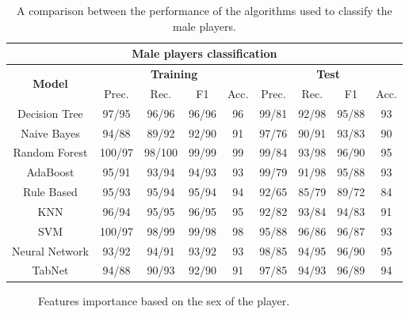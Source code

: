 \begin{table}[H]\footnotesize
\centering
\begin{tabular}{c|c|c|c|c|c|c|c|c}\hline \hline
\multicolumn{9}{c}{\textbf{Male players classification}}\\ \hline \hline
\multirow{2}{*}{\textbf{Model}} & \multicolumn{4}{c|}{\textbf{Training}} & \multicolumn{4}{c}{\textbf{Test}} \\\cline{2-9}
& Prec. & Rec. & F1 & Acc. & Prec. & Rec. & F1 & Acc. \\\hline
Decision Tree & 97/95 & 96/96 & 96/96 & 96 & 99/81 & 92/98 & 95/88 & 93 \\
Naive Bayes & 94/88 & 89/92 & 92/90 & 91 & 97/76 & 90/91 & 93/83 & 90\\
\rowcolor{yellow!70} Random Forest & 100/97 & 98/100 & 99/99 & 99 & 99/84 & 93/98 & 96/90 & 95\\
AdaBoost & 95/91 & 93/94 & 94/93 & 93& 99/79 & 91/98& 95/88 & 93\\
Rule Based & 95/93 & 95/94 & 95/94 & 94 & 92/65 & 85/79 & 89/72 & 84\\
KNN & 96/94 & 95/95 & 96/95 & 95 & 92/82 & 93/84 & 94/83 & 91\\
SVM & 100/97 & 98/99 & 99/98 & 98 & 95/88 & 96/86 & 96/87 & 93\\
\rowcolor{gray!40} Neural Network & 93/92 & 94/91 & 93/92 & 93 & 98/85 & 94/95 & 96/90 & 95\\
\rowcolor{brown!50}TabNet & 94/88 & 90/93 & 92/90 & 91 & 97/85 & 94/93 & 96/89 & 94\\\hline \hline
\end{tabular}
\caption{A comparison between the performance of the algorithms used to classify the male players.}
\label{tab:male_compare}
\end{table}

\begin{figure}[H]
    \centering
    \caption{Features importance based on the sex of the player.}
    \label{fig:FeatImpSex}
\end{figure}